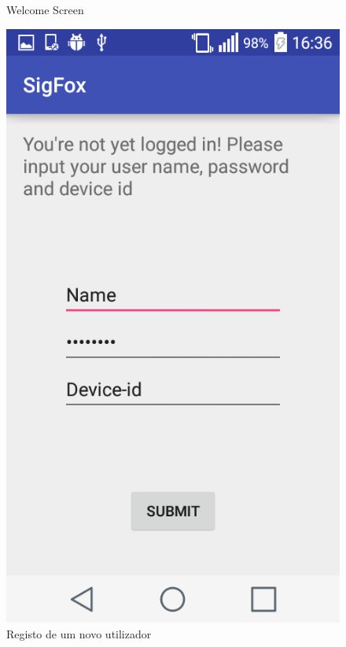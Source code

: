 \documentclass[a4paper]{article}
\begin{document}
\begin{figure}[H]
  \caption{Welcome Screen}\label{fig:welcome}
\endminipage\hfill
{}
  \includegraphics[width=\linewidth]{newUser.png}
  \caption{Registo de um novo utilizador}\label{fig:newUser}
\endminipage\hfill
{}%

\end{figure}
\end{document}
